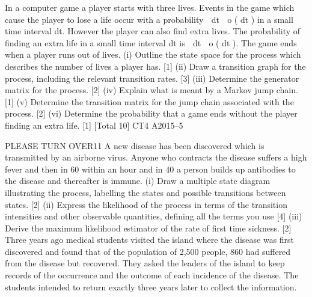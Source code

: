 \documentclass[a4paper,12pt]{article}
\begin{document}
\begin{enumerate}
In a computer game a player starts with three lives. Events in the game which cause
the player to lose a life occur with a probability  dt  o ( dt ) in a small time interval dt.
However the player can also find extra lives. The probability of finding an extra life
in a small time interval dt is  dt  o ( dt ). The game ends when a player runs out of
lives.
(i) Outline the state space for the process which describes the number of lives a
player has.
[1]
(ii) Draw a transition graph for the process, including the relevant transition rates.
[3]
(iii) Determine the generator matrix for the process.
[2]
(iv) Explain what is meant by a Markov jump chain.
[1]
(v) Determine the transition matrix for the jump chain associated with the process.
[2]
(vi) Determine the probability that a game ends without the player finding an extra
life.
[1]
[Total 10]
CT4 A2015–5

PLEASE TURN OVER11
A new disease has been discovered which is transmitted by an airborne virus.
Anyone who contracts the disease suffers a high fever and then in 60%
within an hour and in 40%
a person builds up antibodies to the disease and thereafter is immune.
(i) Draw a multiple state diagram illustrating the process, labelling the states and
possible transitions between states.
[2]
(ii) Express the likelihood of the process in terms of the transition intensities and
other observable quantities, defining all the terms you use
[4]
(iii) Derive the maximum likelihood estimator of the rate of first time sickness.
[2]
Three years ago medical students visited the island where the disease was first
discovered and found that of the population of 2,500 people, 860 had suffered from
the disease but recovered. They asked the leaders of the island to keep records of the
occurrence and the outcome of each incidence of the disease. The students intended
to return exactly three years later to collect the information.


\end{enumerate}
\end{document}
